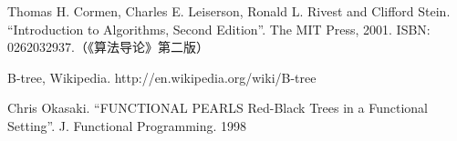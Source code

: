 \documentclass[UTF8]{article}
\begin{document}
\ifx\wholebook\relax \else
\begin{thebibliography}{99}

Thomas H. Cormen, Charles E. Leiserson, Ronald L. Rivest and Clifford Stein. ``Introduction to Algorithms, Second Edition''. The MIT Press, 2001. ISBN: 0262032937.（《算法导论》第二版）

B-tree, Wikipedia. http://en.wikipedia.org/wiki/B-tree

Chris Okasaki. ``FUNCTIONAL PEARLS Red-Black Trees in a Functional Setting''. J. Functional Programming. 1998

\end{thebibliography}
\end{document}
